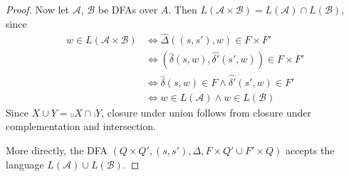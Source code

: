 \begin{proof}
    Now let $\mathcal{A}$, $\mathcal{B}$ be DFAs over $A$.
    Then $L(\mathcal{A} \times \mathcal{B})
    = L(\mathcal{A}) \cap L(\mathcal{B})$, since
    \begin{align*}
        w \in L(\mathcal{A} \times \mathcal{B})
            &\iff \hat{\Delta}((s, s'), w) \in F \times F' \\
            &\iff (\hat{\delta}(s, w), \hat{\delta'}(s', w)) \in F \times F' \\
            &\iff \hat{\delta}(s, w) \in F \land \hat{\delta'}(s', w) \in F' \\
            &\iff w \in L(\mathcal{A}) \land w \in L(\mathcal{B})
    \end{align*}
    Since $X \cup Y = \comp{\comp{X} \cap \comp{Y}}$, closure under union
    follows from closure under complementation and intersection.

    More directly, the DFA
    $(Q \times Q', (s, s'), \Delta, F \times Q' \cup F' \times Q)$
    accepts the language $L(\mathcal{A}) \cup L(\mathcal{B})$.
\end{proof}


